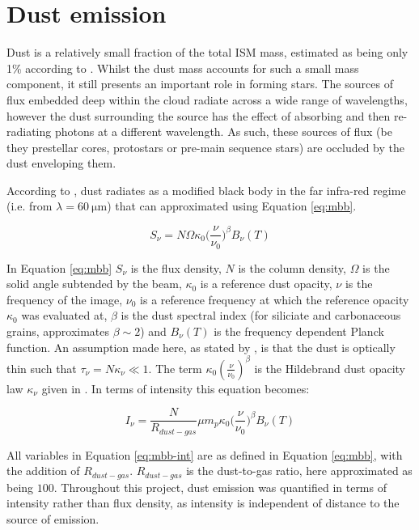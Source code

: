 \documentclass{report}
\begin{document}
\section{Dust emission}
Dust is a relatively small fraction of the total ISM mass, estimated as being only 1\% according to \textcite{noise}. Whilst the dust mass accounts for such a small mass component, it still presents an important role in forming stars. The sources of flux embedded deep within the cloud radiate across a wide range of wavelengths, however the dust surrounding the source has the effect of absorbing and then re-radiating photons at a different wavelength. As such, these sources of flux (be they prestellar cores, protostars or pre-main sequence stars) are occluded by the dust enveloping them.

According to \textcite{noise}, dust radiates as a modified black body in the far infra-red regime (i.e. from $\lambda=\SI{60}{\micro\meter}$) that can approximated using Equation \ref{eq:mbb}.

\begin{equation} \label{eq:mbb}
  S_{\nu} = N \Omega \kappa_{0} \Big(\frac{\nu}{\nu_{0}}\Big)^{\beta} B_{\nu}(T)
\end{equation}

In Equation \ref{eq:mbb} $S_{\nu}$ is the flux density, $N$ is the column density, $\Omega$ is the solid angle subtended by the beam, $\kappa_{0}$ is a reference dust opacity, $\nu$ is the frequency of the image, $\nu_{0}$ is a reference frequency at which the reference opacity $\kappa_{0}$ was evaluated at, $\beta$ is the dust spectral index (for siliciate and carbonaceous grains, \textcite{beta} approximates $\beta \sim 2$) and $B_{\nu}(T)$ is the frequency dependent Planck function. An assumption made here, as stated by \textcite{kelly}, is that the dust is optically thin such that
$\tau_{\nu} = N\kappa_{\nu} \ll 1$. The term $\kappa_{0}(\frac{\nu}{\nu_{0}})^{\beta}$ is the Hildebrand dust opacity law $\kappa_{\nu}$ given in \textcite{dustopacity}. In terms of intensity this equation becomes:

\begin{equation} \label{eq:mbb-int}
  I_{\nu} = \frac{N}{R_{dust-gas}} \mu m_{p} \kappa_{0} \Big(\frac{\nu}{\nu_{0}}\Big)^{\beta} B_{\nu}(T)
\end{equation}

All variables in Equation \ref{eq:mbb-int} are as defined in Equation \ref{eq:mbb}, with the addition of $R_{dust-gas}$. $R_{dust-gas}$ is the dust-to-gas ratio, here approximated as being $100$. Throughout this project, dust emission was quantified in terms of intensity rather than flux density, as intensity is independent of distance to the source of emission.
\end{document}
